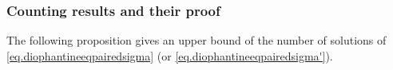 










\subsubsection{Counting results and their proof}
The following proposition gives an upper bound of the number of solutions of \eqref{eq.diophantineeqpairedsigma} (or \eqref{eq.diophantineeqpairedsigma'}).

